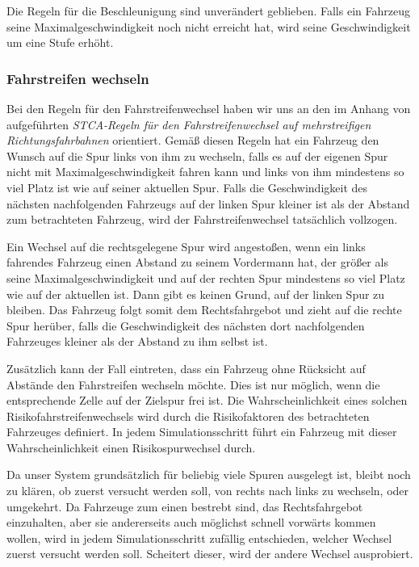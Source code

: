 \documentclass[10pt, a4paper]{article}
\newcommand\q[1]{\glqq{}#1\grqq{}}
\begin{document}
Die Regeln für die Beschleunigung sind unverändert geblieben. Falls ein Fahrzeug seine Maximalgeschwindigkeit noch nicht erreicht hat, wird seine Geschwindigkeit um eine Stufe erhöht.

\subsubsection{Fahrstreifen wechseln}
\label{subsubsec:fahrstreifenWechseln}

Bei den Regeln für den Fahrstreifenwechsel haben wir uns an den im Anhang von \cite{mehrspurig} aufgeführten \emph{\q{STCA-Regeln für den Fahrstreifenwechsel auf mehrstreifigen Richtungsfahrbahnen}} orientiert. Gemäß diesen Regeln hat ein Fahrzeug den Wunsch auf die Spur links von ihm zu wechseln, falls es auf der eigenen Spur nicht mit Maximalgeschwindigkeit fahren kann und links von ihm mindestens so viel Platz ist wie auf seiner aktuellen Spur. Falls die Geschwindigkeit des nächsten nachfolgenden Fahrzeugs auf der linken Spur kleiner ist als der Abstand zum betrachteten Fahrzeug, wird der Fahrstreifenwechsel tatsächlich vollzogen.

Ein Wechsel auf die rechtsgelegene Spur wird angestoßen, wenn ein links fahrendes Fahrzeug einen Abstand zu seinem Vordermann hat, der größer als seine Maximalgeschwindigkeit und auf der rechten Spur mindestens so viel Platz wie auf der aktuellen ist. Dann gibt es keinen Grund, auf der linken Spur zu bleiben. Das Fahrzeug folgt somit dem Rechtsfahrgebot und zieht auf die rechte Spur herüber, falls die Geschwindigkeit des nächsten dort nachfolgenden Fahrzeuges kleiner als der Abstand zu ihm selbst ist.

Zusätzlich kann der Fall eintreten, dass ein Fahrzeug ohne Rücksicht auf Abstände den Fahrstreifen wechseln möchte. Dies ist nur möglich, wenn die entsprechende Zelle auf der Zielspur frei ist. Die Wahrscheinlichkeit eines solchen Risikofahrstreifenwechsels wird durch die Risikofaktoren des betrachteten Fahrzeuges definiert. In jedem Simulationsschritt führt ein Fahrzeug mit dieser Wahrscheinlichkeit einen Risikospurwechsel durch.

Da unser System grundsätzlich für beliebig viele Spuren ausgelegt ist, bleibt noch zu klären, ob zuerst versucht werden soll, von rechts nach links zu wechseln, oder umgekehrt. Da Fahrzeuge zum einen bestrebt sind, das Rechtsfahrgebot einzuhalten, aber sie andererseits auch möglichst schnell vorwärts kommen wollen, wird in jedem Simulationsschritt zufällig entschieden, welcher Wechsel zuerst versucht werden soll. Scheitert dieser, wird der andere Wechsel ausprobiert.
\end{document}
